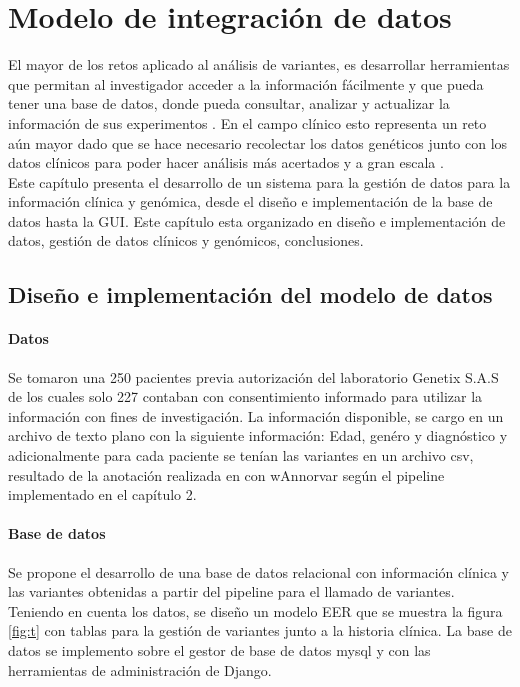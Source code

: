 \chapter{Modelo de integración de datos}

El mayor de los retos aplicado al análisis de variantes, es desarrollar herramientas que permitan al investigador acceder a la información fácilmente y que pueda tener una base de datos, donde pueda consultar, analizar y actualizar la información de sus experimentos \cite{Li2014}. En el campo clínico esto representa un reto aún mayor dado que se hace necesario recolectar los datos genéticos junto con los datos clínicos para poder hacer análisis más acertados y a gran escala \cite{Paila2013}. \\


Este capítulo presenta el desarrollo de un sistema para la gestión de datos para la información clínica y genómica, desde el diseño e implementación de la base de datos hasta la GUI. Este capítulo esta  organizado en diseño e implementación de datos, gestión de datos clínicos y genómicos, conclusiones. 

\section{Diseño e implementación del modelo de datos}

\subsubsection{Datos}

Se tomaron una  250 pacientes previa autorización  del laboratorio Genetix S.A.S de los cuales solo 227 contaban con consentimiento informado para utilizar la información con fines de investigación.  La información disponible, se cargo en un archivo de texto plano con la siguiente información: Edad, genéro y diagnóstico y adicionalmente para cada paciente se tenían las variantes en un archivo csv, resultado de la anotación realizada en con wAnnorvar según el pipeline implementado en el capítulo 2. 

\subsubsection{Base de datos}

Se propone el desarrollo de una base de datos relacional con información clínica y las variantes obtenidas a partir del pipeline para el llamado de variantes. Teniendo en cuenta los datos, se diseño un modelo EER que se  muestra la figura \ref{fig:t} con tablas para la gestión de variantes junto a la historia clínica. La base de datos se implemento sobre el gestor de base de datos mysql y con las herramientas de administración de Django. \\

